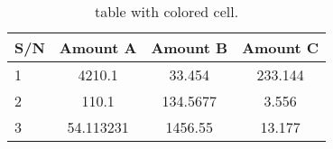 \documentclass{article}
\begin{document}
	
\begin{table}[h!]
	\begin{center}
		\caption{table with colored cell.}
		\label{tab:table1}
		\begin{tabular}{l|c|c|c|}
			\hline
			\textbf{S/N} & \textbf{Amount A} & \textbf{Amount B} & \textbf{Amount C}\\
			\hline
			\cellcolor{blue!25}1 & 4210.1 & 33.454 & 233.144\\
			\cellcolor{green!20}2 & 110.1 & 134.5677 & 3.556\\
			\cellcolor{red!35}3 & 54.113231 & 1456.55 & 13.177\\
			\hline
		\end{tabular}
	\end{center}
\end{table}
\end{document}
